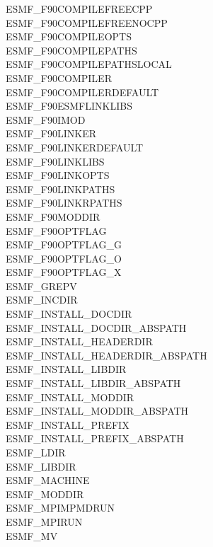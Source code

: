 \begin{description}
\item[ESMF\_F90COMPILEFREECPP]
\item[ESMF\_F90COMPILEFREENOCPP]
\item[ESMF\_F90COMPILEOPTS]
\item[ESMF\_F90COMPILEPATHS]
\item[ESMF\_F90COMPILEPATHSLOCAL]
\item[ESMF\_F90COMPILER]
\item[ESMF\_F90COMPILERDEFAULT]
\item[ESMF\_F90ESMFLINKLIBS]
\item[ESMF\_F90IMOD]
\item[ESMF\_F90LINKER]
\item[ESMF\_F90LINKERDEFAULT]
\item[ESMF\_F90LINKLIBS]
\item[ESMF\_F90LINKOPTS]
\item[ESMF\_F90LINKPATHS]
\item[ESMF\_F90LINKRPATHS]
\item[ESMF\_F90MODDIR]
\item[ESMF\_F90OPTFLAG]
\item[ESMF\_F90OPTFLAG\_G]
\item[ESMF\_F90OPTFLAG\_O]
\item[ESMF\_F90OPTFLAG\_X]
\item[ESMF\_GREPV]
\item[ESMF\_INCDIR]
\item[ESMF\_INSTALL\_DOCDIR]
\item[ESMF\_INSTALL\_DOCDIR\_ABSPATH]
\item[ESMF\_INSTALL\_HEADERDIR]
\item[ESMF\_INSTALL\_HEADERDIR\_ABSPATH]
\item[ESMF\_INSTALL\_LIBDIR]
\item[ESMF\_INSTALL\_LIBDIR\_ABSPATH]
\item[ESMF\_INSTALL\_MODDIR]
\item[ESMF\_INSTALL\_MODDIR\_ABSPATH]
\item[ESMF\_INSTALL\_PREFIX]
\item[ESMF\_INSTALL\_PREFIX\_ABSPATH]
\item[ESMF\_LDIR]
\item[ESMF\_LIBDIR]
\item[ESMF\_MACHINE]
\item[ESMF\_MODDIR]
\item[ESMF\_MPIMPMDRUN]
\item[ESMF\_MPIRUN]
\item[ESMF\_MV]

\end{description}
